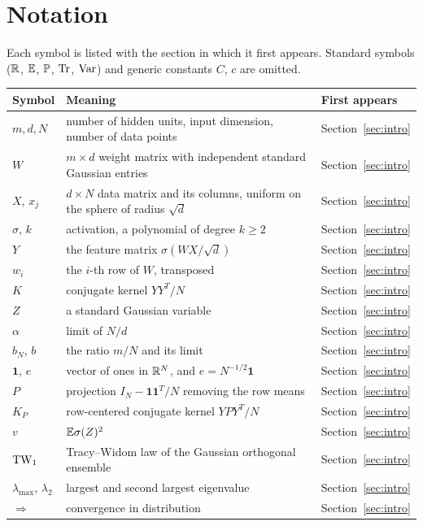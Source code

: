 \section{Notation}\label{app:notation}
Each symbol is listed with the section in which it first appears. Standard symbols ($\mathbb{R}$, $\mathbb{E}$, $\mathbb{P}$, $\operatorname{Tr}$, $\operatorname{Var}$) and generic constants $C$, $c$ are omitted.

{\small
\begin{longtable}{@{}p{}p{}l@{}}\toprule
Symbol & Meaning & First appears \\ \midrule
\endhead
$m,d,N$ & number of hidden units, input dimension, number of data points & Section~\ref{sec:intro} \\
$W$ & $m\times d$ weight matrix with independent standard Gaussian entries & Section~\ref{sec:intro} \\
$X$, $x_j$ & $d\times N$ data matrix and its columns, uniform on the sphere of radius $\sqrt d$ & Section~\ref{sec:intro} \\
$\sigma$, $k$ & activation, a polynomial of degree $k\ge2$ & Section~\ref{sec:intro} \\
$Y$ & the feature matrix $\sigma(WX/\sqrt d)$ & Section~\ref{sec:intro} \\
$w_i$ & the $i$-th row of $W$, transposed & Section~\ref{sec:intro} \\
$K$ & conjugate kernel $YY^{T}/N$ & Section~\ref{sec:intro} \\
$Z$ & a standard Gaussian variable & Section~\ref{sec:intro} \\
$\alpha$ & limit of $N/d$ & Section~\ref{sec:intro} \\
$b_N$, $b$ & the ratio $m/N$ and its limit & Section~\ref{sec:intro} \\
$\mathbf 1$, $e$ & vector of ones in $\mathbb{R}^N$, and $e=N^{-1/2}\mathbf 1$ & Section~\ref{sec:intro} \\
$P$ & projection $I_N-\mathbf 1\mathbf 1^{T}/N$ removing the row means & Section~\ref{sec:intro} \\
$K_P$ & row-centered conjugate kernel $YPY^{T}/N$ & Section~\ref{sec:intro} \\
$v$ & $\mathbb{E}\sigma(Z)^2$ & Section~\ref{sec:intro} \\
$\mathrm{TW}_1$ & Tracy--Widom law of the Gaussian orthogonal ensemble & Section~\ref{sec:intro} \\
$\lambda_{\max}$, $\lambda_2$ & largest and second largest eigenvalue & Section~\ref{sec:intro} \\
$\Longrightarrow$ & convergence in distribution & Section~\ref{sec:intro} \\

\end{longtable}}
